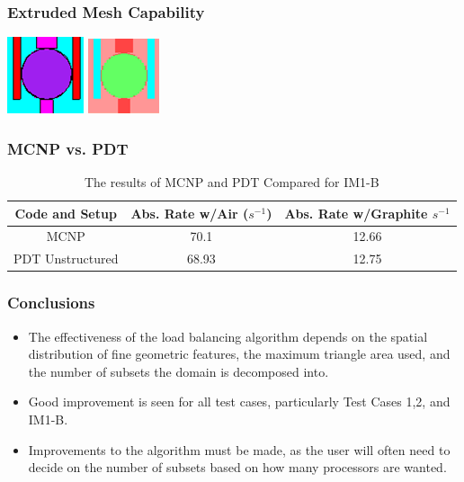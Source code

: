 \documentclass[compress]{beamer}
\begin{document}
\begin{frame}[t]\frametitle{Extruded Mesh Capability}
\centering
\vspace{2cm}
\includegraphics[scale=1.3]{figures/IM1_MCNP_Zoom.png}
\includegraphics[scale=1.3]{figures/IM1_PDT_Zoom.png}
\end{frame}

\begin{frame}[t]\frametitle{MCNP vs. PDT}
\begin{table}[H]
\centering
\small
\caption{The results of MCNP and PDT Compared for IM1-B}
\begin{tabular}{c | c | c}
\hline
\textbf{Code and Setup} & Abs. Rate w/Air ($s^{-1}$) & Abs. Rate w/Graphite $s^{-1}$\\
\hline
MCNP & 70.1 & 12.66 \\
PDT Unstructured & 68.93 & 12.75 \\
\hline

\end{tabular}
\end{table}
\end{frame}



\begin{frame}[t]\frametitle{Conclusions}
\begin{block}{}
\begin{itemize}
\item The effectiveness of the load balancing algorithm depends on the spatial distribution of fine geometric features, the maximum triangle area used, and the number of subsets the domain is decomposed into.
\item Good improvement is seen for all test cases, particularly Test Cases 1,2, and IM1-B. 
\item Improvements to the algorithm must be made, as the user will often need to decide on the number of subsets based on how many processors are wanted. 
\end{itemize}
\end{block}
\end{frame}
\end{document}
